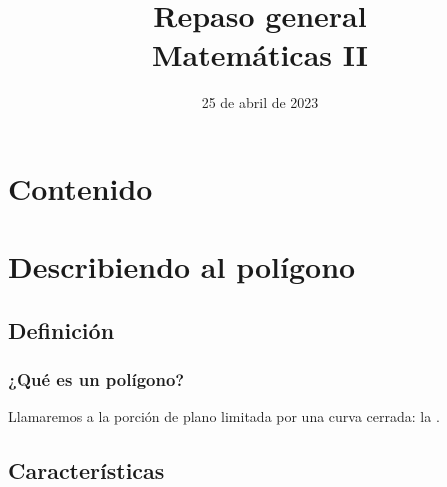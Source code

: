 \documentclass[14pt]{beamer}
\title{\Large{Repaso general} \\ \normalsize{Matemáticas II}}
\date{25 de abril de 2023}
\begin{document}
\maketitle

\section*{Contenido}

\section{Describiendo al polígono}
\subsection{Definición}

\begin{frame}
\frametitle{¿Qué es un polígono?}
Llamaremos  a la porción de plano limitada por una curva cerrada: la .
\end{frame}

\subsection{Características}
\end{document}
